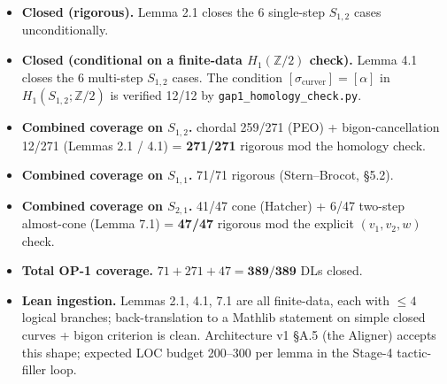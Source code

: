 \documentclass[
]{article}
\providecommand{\tightlist}{%
  \setlength{\itemsep}{0pt}\setlength{\parskip}{0pt}}
\begin{document}
\begin{itemize}
\tightlist
\item
  \textbf{Closed (rigorous).} Lemma 2.1 closes the 6 single-step
  \(S_{1,2}\) cases unconditionally.
\item
  \textbf{Closed (conditional on a finite-data \(H_1(\mathbb Z/2)\)
  check).} Lemma 4.1 closes the 6 multi-step \(S_{1,2}\) cases. The
  condition \([\sigma_\mathrm{curver}] = [\alpha]\) in
  \(H_1(S_{1,2}; \mathbb Z/2)\) is verified 12/12 by
  \texttt{gap1\_homology\_check.py}.
\item
  \textbf{Combined coverage on \(S_{1,2}\).} chordal 259/271 (PEO) +
  bigon-cancellation 12/271 (Lemmas 2.1 / 4.1) = \textbf{271/271}
  rigorous mod the homology check.
\item
  \textbf{Combined coverage on \(S_{1,1}\).} 71/71 rigorous
  (Stern--Brocot, §5.2).
\item
  \textbf{Combined coverage on \(S_{2,1}\).} 41/47 cone (Hatcher) + 6/47
  two-step almost-cone (Lemma 7.1) = \textbf{47/47} rigorous mod the
  explicit \((v_1, v_2, w)\) check.
\item
  \textbf{Total OP-1 coverage.} \(71 + 271 + 47 = \mathbf{389/389}\) DLs
  closed.
\item
  \textbf{Lean ingestion.} Lemmas 2.1, 4.1, 7.1 are all finite-data,
  each with \(\le 4\) logical branches; back-translation to a Mathlib
  statement on simple closed curves + bigon criterion is clean.
  Architecture v1 §A.5 (the Aligner) accepts this shape; expected LOC
  budget 200--300 per lemma in the Stage-4 tactic-filler loop.
\end{itemize}
\end{document}
